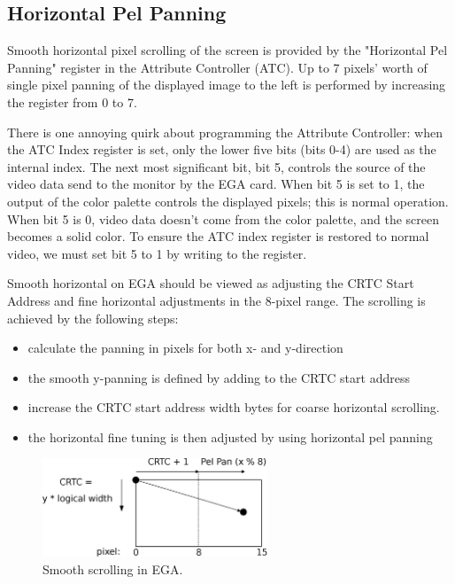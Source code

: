 \documentclass[book.tex]{subfiles}
\begin{document}
\subsection{Horizontal Pel Panning}
Smooth horizontal pixel scrolling of the screen is provided by the "Horizontal Pel Panning" register in the Attribute Controller (ATC). Up to 7 pixels' worth of single pixel panning of the displayed image to the left is performed by increasing the register from 0 to 7. \\
\par

There is one annoying quirk about programming the Attribute Controller: when the ATC Index register is set, only the lower five bits (bits 0-4) are used as the internal index. The next most significant bit, bit 5, controls the source of the video data send to the monitor by the EGA card. When bit 5 is set to 1, the output of the color palette controls the displayed pixels; this is normal operation. When bit 5 is 0, video data doesn't come from the color palette, and the screen becomes a solid color. To ensure the ATC index register is restored to normal video, we must set bit 5 to 1 by writing  to the register.\\ 

\begin{minipage}{\textwidth}
  
  \end{minipage}
  \label{ega_pel_pan}
  \par


Smooth horizontal on EGA should be viewed as adjusting the CRTC Start Address and fine horizontal adjustments in the 8-pixel range. The scrolling is achieved by the following steps:
\begin{itemize}
  \item calculate the panning in pixels for both x- and y-direction
  \item the smooth y-panning is defined by adding  to the CRTC start address
  \item increase the CRTC start address width  bytes for coarse horizontal scrolling.
  \item the horizontal fine tuning is then adjusted by  using horizontal pel panning
\end{itemize}




\begin{figure}[H]
\centering
\includegraphics[width=0.6\textwidth]{imgs/drawings/Tile_Refresh.eps}
\caption{Smooth scrolling in EGA.}
\label{fig:tile_refresh}
\end{figure}
\end{document}
